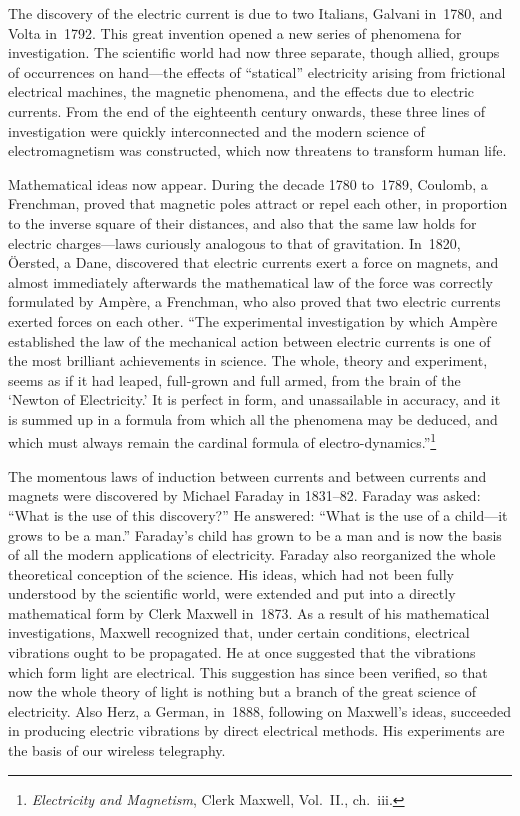 \documentclass[12pt,leqno]{book}[2005/09/16]
\newcommand{\Chg}[2]{#2}
\newcommand{\Add}[1]{\Chg{}{#1}}
\newcommand{\PageSep}[1]{\ignorespaces}
\newcommand{\Title}[1]{\textit{#1}}
\begin{document}
The discovery of the electric current is due
%
to two Italians, Galvani in~1780, and Volta
%
%
in~1792. This great invention opened a new
series of phenomena for investigation. The
scientific world had now three separate,
though allied, groups of occurrences on hand---the
effects of ``statical'' electricity arising
from frictional electrical machines, the magnetic
phenomena, and the effects due to
electric currents. From the end of the
eighteenth century onwards, these three lines
of investigation were quickly \Chg{inter-connected}{interconnected}
and the modern science of electromagnetism
was constructed, which now threatens to
transform human life.

Mathematical ideas now appear. During
the decade 1780 to~1789, Coulomb, a Frenchman,
%
proved that magnetic poles attract or
repel each other, in proportion to the inverse
square of their distances, and also that the
\PageSep{34}
same law holds for electric charges---laws
curiously analogous to that of gravitation.
In~1820, Öersted, a Dane, discovered that
%
electric currents exert a force on magnets,
and almost immediately afterwards the
mathematical law of the force was correctly
formulated by Ampère, a Frenchman, who
%
also proved that two electric currents exerted
forces on each other. ``The experimental investigation
by which Ampère established the
law of the mechanical action between electric
currents is one of the most brilliant achievements
in science. The whole, theory and
experiment, seems as if it had leaped, full-grown
and full armed, from the brain of
the `Newton of Electricity.' It is perfect
%
in form, and unassailable in accuracy, and it
is summed up in a formula from which all
the phenomena may be deduced, and which
must always remain the cardinal formula of
electro-dynamics.''\footnote
  {\Title{Electricity and Magnetism}, Clerk Maxwell, Vol.~II.,
%
  ch.~iii.}

The momentous laws of induction between
currents and between currents and magnets
were discovered by Michael Faraday in 1831--82.
%
Faraday was asked: ``What is the use
of this discovery?'' He answered: ``What is
the use of a child---it grows to be a man.''
Faraday's child has grown to be a man and
is now the basis of all the modern applications
\PageSep{35}
of electricity. Faraday also reorganized the
whole theoretical conception of the science.
His ideas, which had not been fully understood
by the scientific world, were extended
and put into a directly mathematical form by
Clerk Maxwell in~1873. As a result of his
%
mathematical investigations, Maxwell recognized
that, under certain conditions, electrical
vibrations ought to be propagated. He at
once suggested that the vibrations which
form light are electrical. This suggestion has
%
since been verified, so that now the whole
theory of light is nothing but a branch of the
great science of electricity. Also Herz, a
%
German, in~1888, following on Maxwell's
ideas, succeeded in producing electric vibrations
by direct electrical methods\Add{.} His
experiments are the basis of our wireless
telegraphy.
\end{document}
